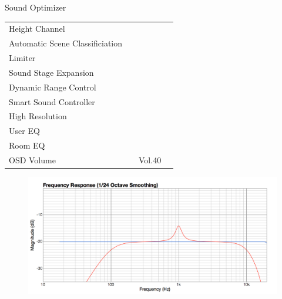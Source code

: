 \documentclass{beamer}
\begin{document}
\begin{frame}[t]{Sound Optimizer}
\begin{tiny}
\begin{tabular}{@{}lccc@{}}
Height Channel & \color{black}{Off} & & \\
Automatic Scene Classificiation & \color{black}{Off} & & \\
Limiter & \color{black}{Off} & & \\
Sound Stage Expansion & \color{black}{Off} & & \\
Dynamic Range Control & \color{black}{Off} & & \\
Smart Sound Controller & \color{black}{Off} & & \\
High Resolution & \color{black}{Off} & & \\
User EQ & \color{black}{Off} & & \\
Room EQ & \color{black}{Off} & & \\
OSD Volume & \color{blue}{On} & Vol.40 & \\
\midrule
\end{tabular}
\end{tiny}

\begin{figure}[b]
\includegraphics[height=0.32\textwidth]{figure/soundoptimizer.png}
\end{figure}

\end{frame}
\end{document}
